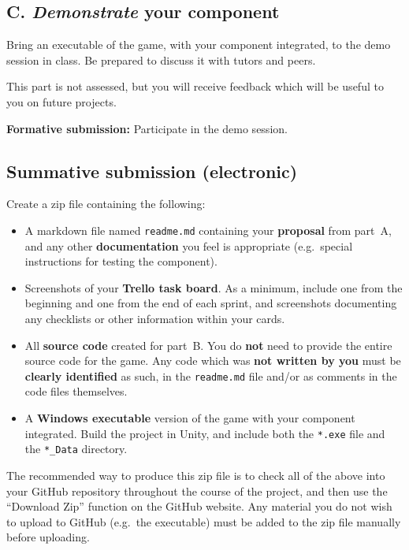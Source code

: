 \documentclass{../fal_assignment}
\begin{document}
\subsection*{C. \emph{Demonstrate} your component}

Bring an executable of the game, with your component integrated, to the demo session in class.
Be prepared to discuss it with tutors and peers.

This part is not assessed, but you will receive feedback which will be useful to you on future projects.

\textbf{Formative submission:} Participate in the demo session.

\subsection*{Summative submission (electronic)}

Create a zip file containing the following:

\begin{itemize}
\item A markdown file named \texttt{readme.md} containing your \textbf{proposal} from part~A,
    and any other \textbf{documentation} you feel is appropriate
    (e.g.\ special instructions for testing the component).
\item Screenshots of your \textbf{Trello task board}.
    As a minimum, include one from the beginning and one from the end of each sprint,
    and screenshots documenting any checklists or other information within your cards.
\item All \textbf{source code} created for part~B.
    You do \textbf{not} need to provide the entire source code for the game.
    Any code which was \textbf{not written by you} must be \textbf{clearly identified} as such,
    in the \texttt{readme.md} file and/or as comments in the code files themselves.
\item A \textbf{Windows executable} version of the game with your component integrated.
    Build the project in Unity, and include both the \texttt{*.exe} file and the \texttt{*\_Data} directory.
\end{itemize}

The recommended way to produce this zip file is to check all of the above into your GitHub repository
throughout the course of the project,
and then use the ``Download Zip'' function on the GitHub website.
Any material you do not wish to upload to GitHub (e.g.\ the executable)
must be added to the zip file manually before uploading.
\end{document}
